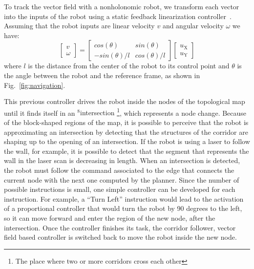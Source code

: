 \documentclass[smallcondensed]{svjour3}
\begin{document}
To track the vector field with a nonholonomic robot, we transform each vector into the inputs of the robot using a static feedback linearization controller~\citep{d1995control}. Assuming that the robot inputs are linear velocity $v$ and angular velocity $\omega$ we have:
%
\begin{equation}
    \begin{bmatrix} v \\ \omega \end{bmatrix} = \begin{bmatrix} cos(\theta) & sin (\theta) \\ -sin (\theta)/l & cos (\theta)/l \end{bmatrix} 		\begin{bmatrix} u_\text{X} \\ u_\text{Y} \end{bmatrix} 
    \label{eq:transformation}
\end{equation}
%
where $l$ is the distance from the center of the robot to its control point and $\theta$ is the angle between the robot and the reference frame, as shown in Fig.~\ref{fig:navigation}.

This previous controller drives the robot inside the nodes of the topological map until it finds itself in an {\color{blue}$^8$intersection \footnote{The place where two or more corridors cross each other}}, which represents a node change. Because of the block-shaped regions of the map, it is possible to perceive that the robot is approximating an intersection by detecting that the structures of the corridor are shaping up to the opening of an intersection. If the robot is using a laser to follow the wall, for example, it is possible to detect that the segment that represents the wall in the laser scan is decreasing in length. When an intersection is detected, the robot must follow the command associated to the edge that connects the current node with the next one computed by the planner. Since the number of possible instructions is small, one simple controller can be developed for each instruction.  For example, a ``Turn Left'' instruction would lead to the activation of a proportional controller that would turn the robot by 90 degrees to the left, so it can move forward and enter the region of the new node, after the intersection. Once the controller finishes its task, the corridor follower, vector field based controller is switched back to move the robot inside the new node. 

\end{document}
